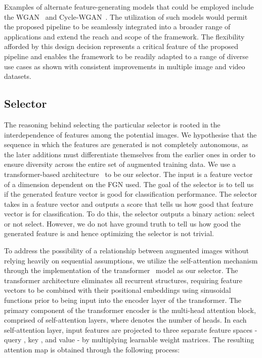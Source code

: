 \documentclass[10pt,twocolumn,letterpaper]{article}
\begin{document}
Examples of alternate feature-generating models that could be employed include the WGAN~\cite{clswgan} and Cycle-WGAN~\cite{cyclewgan}. The utilization of such models would permit the proposed pipeline to be seamlessly integrated into a broader range of applications and extend the reach and scope of the framework. The flexibility afforded by this design decision represents a critical feature of the proposed pipeline and enables the framework to be readily adapted to a range of diverse use cases as shown with consistent improvements in multiple image and video datasets.

\subsection{Selector}

The reasoning behind selecting the particular selector is rooted in the interdependence of features among the potential images. We hypothesise that the sequence in which the features are generated is not completely autonomous, as the later additions must differentiate themselves from the earlier ones in order to ensure diversity across the entire set of augmented training data. We use a transformer-based architecture~\cite{vit} to be our selector. The input is a feature vector of a dimension dependent on the FGN used. The goal of the selector is to tell us if the generated feature vector is good for classification performance. The selector takes in a feature vector and outputs a score that tells us how good that feature vector is for classification. To do this, the selector outputs a binary action: select or not select. However, we do not have ground truth to tell us how good the generated feature is and hence optimizing the selector is not trivial.

To address the possibility of a relationship between augmented images without relying heavily on sequential assumptions, we utilize the self-attention mechanism through the implementation of the transformer~\cite{vit} model as our selector. The transformer architecture eliminates all recurrent structures, requiring feature vectors to be combined with their positional embeddings using sinusoidal functions prior to being input into the encoder layer of the transformer. The primary component of the transformer encoder is the multi-head attention block, comprised of  self-attention layers, where  denotes the number of heads. In each self-attention layer, input features are projected to three separate feature spaces - query , key , and value - by multiplying learnable weight matrices. The resulting attention map is obtained through the following process:
\end{document}
